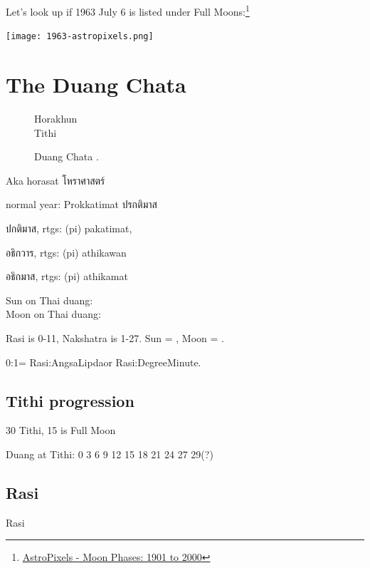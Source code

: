 \documentclass[11pt,oneside]{memoir-article}
\begin{document}
Let's look up if 1963 July 6 is listed under Full Moons:\footnote{\href{http://astropixels.com/ephemeris/phasescat/phases1901.html}{AstroPixels - Moon Phases: 1901 to 2000}}

{\centering
\texttt{[image: 1963-astropixels.png]}
\par}

\label{calculating-the-sun-and-moon-end}

\clearpage

\chapter{The Duang Chata}
\label{sec-5}
\label{duangchata}

\begin{figure}[h]
\caption{Duang Chata .}
\resizebox{\linewidth}{!}{\DuangChata[Sun={2/0/0}, Moon={4/5/10}, fancy]}

Horakhun\\
Tithi

\end{figure}

Aka horasat โหราศาสตร์

normal year: Prokkatimat ปรกติมาส

ปกติมาส, rtgs: (pi) pakatimat,

อธิกวาร, rtgs: (pi) athikawan

อธิกมาส, rtgs: (pi) athikamat

Sun on Thai duang: \\
Moon on Thai duang: 

Rasi is 0-11, Nakshatra is 1-27. Sun = \theSun, Moon = \theMoon.

0:1\minute = Rasi:Angsa\degree Lipda\minute or Rasi:Degree\degree Minute\minute.

\label{duangchata-end}

\section{Tithi progression}
\label{sec-5-1}

30 Tithi, 15 is Full Moon

Duang at Tithi: 0 3 6 9 12 15 18 21 24 27 29(?)

\section{Rasi}
\label{sec-5-2}

Rasi 
\end{document}
